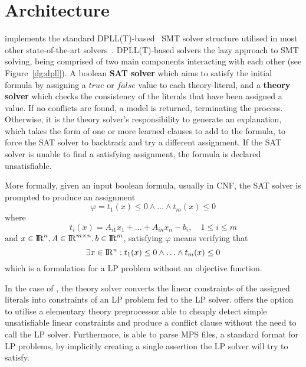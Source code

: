 \documentclass[runningheads]{llncs}
\begin{document}
\section{Architecture}

\dlinear implements the standard DPLL(T)-based~\cite{ref:dpll-t} SMT solver structure utilised in most other state-of-the-art solvers~\cite{ref:z3-dpll-t}.
DPLL(T)-based solvers the lazy approach to SMT solving, being comprised of two main components interacting with each other (see Figure~\ref{dg:dpll}).
A boolean \textbf{SAT solver} which aims to satisfy the initial formula by assigning a $true$ or $false$ value to each theory-literal, and a \textbf{theory solver} which checks the consistency of the literals that have been assigned a value.
If no conflicts are found, a model is returned, terminating the process.
Otherwise, it is the theory solver's responsibility to generate an explanation, which takes the form of one or more learned clauses to add to the formula, to force the SAT solver to backtrack and try a different assignment.
If the SAT solver is unable to find a satisfying assignment, the formula is declared unsatisfiable.

More formally, given an input boolean formula, usually in CNF, the SAT solver is prompted to produce an assignment
\begin{equation} %
    \label{eq:smt-formula}
    \varphi = t_1(x) \le 0 \wedge \ldots \wedge t_m (x) \le 0
\end{equation}
where
\begin{equation*}
    t_i(x) = A_{i1}x_1 + \ldots + A_{in}x_n - b_i, \quad 1 \le i \le m
\end{equation*}
and $x \in {\rm I\!R}^n, A \in {\rm I\!R}^{m \times n}, b \in {\rm I\!R}^m$, satisfying $\varphi$ means verifying that
\begin{equation*}
    \exists x \in {\rm I\!R}^n : t_1(x) \le 0 \wedge \ldots \wedge t_m(x) \le 0
\end{equation*}
which is a formulation for a LP problem without an objective function.

In the case of \dlinear, the theory solver converts the linear constraints of the assigned literals into constraints of an LP problem fed to the LP solver.
\dlinear offers the option to utilise a elementary theory preprocessor able to cheaply detect simple unsatisfiable linear constraints and produce a conflict clause without the need to call the LP solver.
Furthermore, \dlinear is able to parse MPS files, a standard format for LP problems, by implicitly creating a single assertion the LP solver will try to satisfy.
\end{document}
